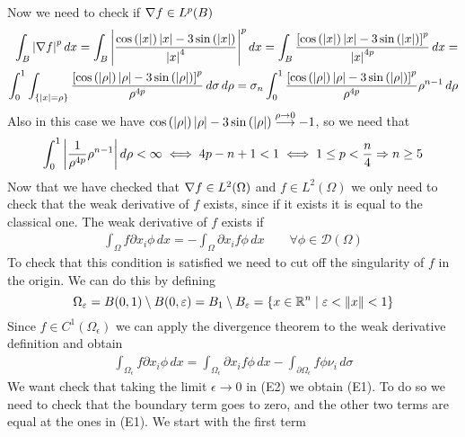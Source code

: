 Now we need to check if \(\nabla f \in L^p(B)\)
\[
    \begin{split}
        \int_B \abs{\nabla f}^p \, dx = \int_B \abs{\frac{\cos\left(\abs{x}\right) \abs{x} - 3 \sin\left(\abs{x}\right)}{\abs{x}^4}}^p \, dx = \int_B  \frac{\left[\cos\left(\abs{x}\right) \abs{x} - 3 \sin\left(\abs{x}\right)\right]^p} {\abs{x}^{4p}} \, dx = \\
        \int_0^1 \int_{\left\{\abs{x} = \rho\right\}}  \frac{\left[\cos\left(\abs{\rho}\right) \abs{\rho} - 3 \sin\left(\abs{\rho}\right)\right]^p} {\rho^{4p}} \, d\sigma \, d\rho = \sigma_n \int_0^1  \frac{\left[\cos\left(\abs{\rho}\right) \abs{\rho} - 3 \sin\left(\abs{\rho}\right)\right]^p} {\rho^{4p}} \rho^{n-1} \, d\rho
    \end{split}
\]
Also in this case we have \(\cos\left(\abs{\rho}\right) \abs{\rho} - 3 \sin\left(\abs{\rho}\right) \overset{\rho \to 0}{\longrightarrow} -1\), so we need that
\[
    \begin{split}
        \int_0^1 \abs{\frac{1} {\rho^{4p}} \rho^{n-1}} \, d\rho < \infty \iff 4p - n + 1 < 1 \iff 1 \leq p < \frac{n}{4} \Rightarrow n \geq 5
    \end{split}
\]
Now that we have checked that \(\nabla f \in L^2(\Omega)\) and \(f \in L^2(\Omega)\) we only need to check that the weak derivative of \(f\) exists, since if it exists it is equal to the classical one. The weak derivative of \(f\) exists if
\[
    \begin{split}
        \int_\Omega f \partial x_i \phi \, dx = - \int_\Omega \partial x_i f \phi \, dx \qquad \forall \phi \in \mathcal{D}(\Omega)
    \end{split}
    \tag*{E1}
\]
To check that this condition is satisfied we need to cut off the singularity of \(f\) in the origin. We can do this by defining
\[
    \Omega_\varepsilon = B(0, 1) \setminus B(0, \varepsilon) = B_1 \setminus B_\varepsilon = \left\{ x \in \mathbb{R}^n \mid \varepsilon < \norm{x} < 1 \right\}
\]
Since \(f \in C^1(\Omega_\epsilon)\) we can apply the divergence theorem to the weak derivative definition and obtain
\[
    \begin{split}
        \int_{\Omega_\epsilon} f \partial x_i \phi \, dx = \int_{\Omega_\epsilon} \partial x_i f \phi \, dx - \int_{\partial\Omega_\epsilon} f \phi \nu_i \, d\sigma
    \end{split}
    \tag*{E2}
\]
We want check that taking the limit \(\epsilon \to 0\) in (E2) we obtain (E1). To do so we need to check that the boundary term goes to zero, and the other two terms are equal at the ones in (E1). We start with the first term
